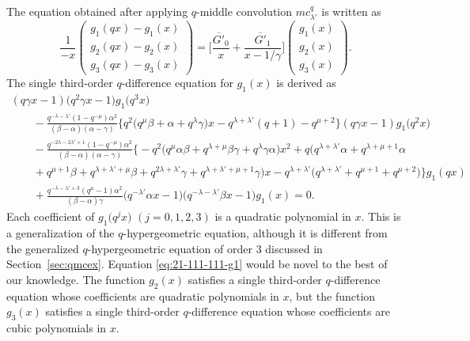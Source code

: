 \documentclass[pdftex]{sigma}
\numberwithin{equation}{section}
\theoremstyle{definition}
\begin{document}
The equation obtained after applying $q$-middle convolution $mc^q_{\lambda'}$ is written as
\begin{equation} \label{eq:21-111-111}
\frac{1}{-x}
\begin{pmatrix}
 g_1(qx) - g_1(x) \\
 g_2(qx) - g_2(x) \\
 g_3(qx) - g_3(x)
\end{pmatrix}
= \bigg[ \frac{\overline{G'}_0}{x} + \frac{\overline{G'}_1}{x-1/\gamma} \bigg]
 \begin{pmatrix}
 g_1(x) \\
 g_2(x) \\
 g_3(x)
 \end{pmatrix}.
\end{equation}
The single third-order $q$-difference equation for $g_1(x)$ is derived as
\begin{gather}
(q \gamma x-1)\bigl(q^2 \gamma x-1\bigr) g_1\bigl(q^3 x\bigr) \nonumber \\
\qquad{}- \frac{q^{ - \lambda - \lambda'}(1- q^{-\mu})\alpha^2}{(\beta-\alpha)(\alpha-\gamma)} \bigl\{q^2\bigl(q^{\mu}\beta + \alpha +q^{\lambda}\gamma\bigr)x - q^{\lambda+\lambda'} (q+1) - q^{\mu+2} \bigr\} (q \gamma x-1) g_1\bigl(q^2 x\bigr) \nonumber \\
\qquad{}- \frac{q^{- 2\lambda - 2\lambda' + 1}(1 - q^{-\mu})\alpha^2}{(\beta-\alpha)(\alpha-\gamma)}
\bigl\{ -q^2\bigl(q^{\mu}\alpha\beta + q^{\lambda+\mu}\beta\gamma + q^{\lambda}\gamma\alpha\bigr)x^2+ q\bigl(q^{\lambda+\lambda'}\alpha + q^{\lambda+\mu+1}\alpha \nonumber \\
\qquad{}+ q^{\mu+1}\beta + q^{\lambda+\lambda'+\mu}\beta + q^{2\lambda+\lambda'}\gamma + q^{\lambda+\lambda'+\mu+1}\gamma \bigr)x -q^{\lambda+\lambda'}\bigl(q^{\lambda+\lambda'} + q^{\mu+1} + q^{\mu+2}\bigr) \bigr\} g_1(qx)\! \nonumber \\
\qquad {}+ \frac{q^{-\lambda - \lambda' + 3}(q^{\mu} -1)\alpha^2}{(\beta-\alpha)\gamma}
\bigl(q^{-\lambda'}\alpha x - 1\bigr)\bigl(q^{-\lambda - \lambda'}\beta x - 1\bigr) g_1(x)
=0. \label{eq:21-111-111-g1}
\end{gather}
Each coefficient of $g_1 \bigl(q^j x\bigr)$ $(j=0,1,2,3)$ is a quadratic polynomial in $x$.
This is a generalization of the $q$-hypergeometric equation, although it is different from the generalized $q$-hypergeometric equation of order $3$ discussed in Section~\ref{sec:qmcex}.
Equation \eqref{eq:21-111-111-g1} would be novel to the best of our knowledge.
The function $g_2(x)$ satisfies a single third-order $q$-difference equation whose coefficients are quadratic polynomials in $x$, but the function $g_3(x)$ satisfies a single third-order $q$-difference equation whose coefficients are cubic polynomials in $x$.
\end{document}
